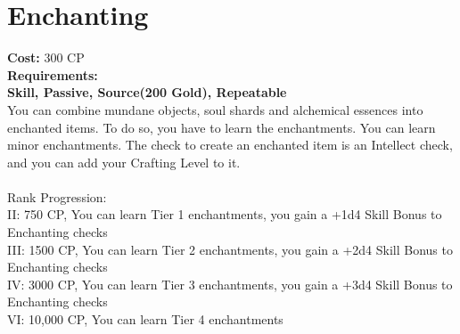 \section{Enchanting}\label{perk:enchanting}
\textbf{Cost:} 300 CP\\
\textbf{Requirements:} ~\\
\textbf{Skill, Passive, Source(200 Gold), Repeatable}\\
You can combine mundane objects, soul shards and alchemical essences into enchanted items.
To do so, you have to learn the enchantments.
You can learn minor enchantments.
The check to create an enchanted item is an Intellect check, and you can add your Crafting Level to it.\\
\\
Rank Progression:\\
II: 750 CP, You can learn Tier 1 enchantments, you gain a +1d4 Skill Bonus to Enchanting checks\\
III: 1500 CP, You can learn Tier 2 enchantments, you gain a +2d4 Skill Bonus to Enchanting checks\\
IV: 3000 CP, You can learn Tier 3 enchantments, you gain a +3d4 Skill Bonus to Enchanting checks\\
VI: 10,000 CP, You can learn Tier 4 enchantments\\